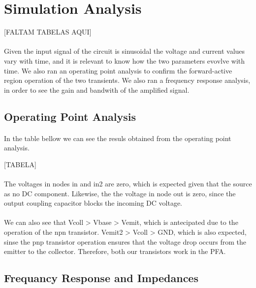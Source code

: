 \section{Simulation Analysis}
\label{sec:simulation}

[FALTAM TABELAS AQUI]

\paragraph{} Given the input signal of the circuit is sinusoidal the voltage and current values vary with time, and it is relevant to know how the two parameters evovlve with time. 
We also ran an operating point analysis to confirm the forward-active region operation of the two transients. We also ran a frequency response analysis, in order to see the gain and
 bandwith of the amplified signal.

\subsection{Operating Point Analysis}

\paragraph{} In the table bellow we can see the resuls obtained from the operating point analysis.

[TABELA]

\paragraph{} The voltages in nodes in and in2 are zero, which is expected given that the source as no DC component. Likewise, the the voltage in node out is zero, since the output 
coupling capacitor blocks the incoming DC voltage.

\paragraph{} We can also see that Vcoll > Vbase > Vemit, which is antecipated due to the operation of the npn transistor. Vemit2 > Vcoll > GND, which is also expected, sinse the pnp 
transistor operation ensures that the voltage drop occurs from the emitter to the collector. Therefore, both our transistors work in the PFA.

\subsection{Frequancy Response and Impedances}

